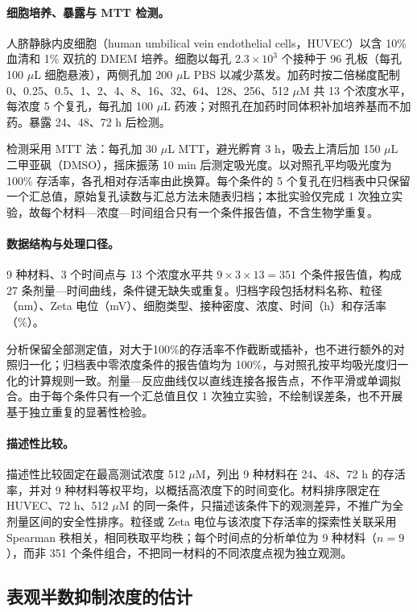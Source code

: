 \documentclass[letterpaper]{article}
\begin{document}
\paragraph{细胞培养、暴露与 MTT 检测。}
人脐静脉内皮细胞（human umbilical vein endothelial cells，HUVEC）以含 10\% 血清和 1\% 双抗的 DMEM 培养。细胞以每孔 $2.3\times 10^{3}$ 个接种于 96 孔板（每孔 100 $\mu$L 细胞悬液），两侧孔加 200 $\mu$L PBS 以减少蒸发。加药时按二倍梯度配制 0、0.25、0.5、1、2、4、8、16、32、64、128、256、512 $\mu$M 共 13 个浓度水平，每浓度 5 个复孔，每孔加 100 $\mu$L 药液；对照孔在加药时同体积补加培养基而不加药。暴露 24、48、72 h 后检测。

检测采用 MTT 法：每孔加 30 $\mu$L MTT，避光孵育 3 h，吸去上清后加 150 $\mu$L 二甲亚砜（DMSO），摇床振荡 10 min 后测定吸光度。以对照孔平均吸光度为 100\% 存活率，各孔相对存活率由此换算。每个条件的 5 个复孔在归档表中只保留一个汇总值，原始复孔读数与汇总方法未随表归档；本批实验仅完成 1 次独立实验，故每个材料—浓度—时间组合只有一个条件报告值，不含生物学重复。

\paragraph{数据结构与处理口径。}
9 种材料、3 个时间点与 13 个浓度水平共 $9\ensuremath{\times} 3\ensuremath{\times} 13 = 351$ 个条件报告值，构成 27 条剂量—时间曲线，条件键无缺失或重复。归档字段包括材料名称、粒径（nm）、Zeta 电位（mV）、细胞类型、接种密度、浓度、时间（h）和存活率（\%）。

分析保留全部测定值，对大于\nobreakspace{}100\%的存活率不作截断或插补，也不进行额外的对照归一化；归档表中零浓度条件的报告值均为 100\%，与对照孔按平均吸光度归一化的计算规则一致。剂量—反应曲线仅以直线连接各报告点，不作平滑或单调拟合。由于每个条件只有一个汇总值且仅 1 次独立实验，不绘制误差条，也不开展基于独立重复的显著性检验。

\paragraph{描述性比较。}
描述性比较固定在最高测试浓度 512 $\mu$M，列出 9 种材料在 24、48、72 h 的存活率，并对 9 种材料等权平均，以概括高浓度下的时间变化。材料排序限定在 HUVEC、72 h、512 $\mu$M 的同一条件，只描述该条件下的观测差异，不推广为全剂量区间的安全性排序。粒径或 Zeta 电位与该浓度下存活率的探索性关联采用 Spearman 秩相关，相同秩取平均秩；每个时间点的分析单位为 9 种材料（$n = 9$），而非 351 个条件组合，不把同一材料的不同浓度点视为独立观测。

\subsection{表观半数抑制浓度的估计}
\end{document}
